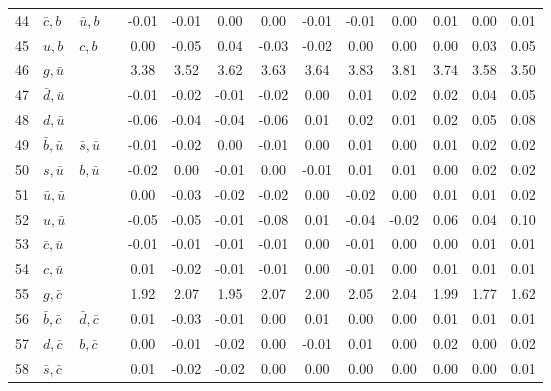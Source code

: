 \begin{tabularx}{\textwidth}{rXXX@{}S@{}S@{}S@{}S@{}S@{}S@{}S@{}S@{}S@{}S}
 44 & $\bar c, b$      & $\bar u, b$       &                  & -0.01 & -0.01 &  0.00 &  0.00 & -0.01 & -0.01 &  0.00 &  0.01 &  0.00 &  0.01 \\
 45 & $u, b$           & $c, b$            &                  &  0.00 & -0.05 &  0.04 & -0.03 & -0.02 &  0.00 &  0.00 &  0.00 &  0.03 &  0.05 \\
 46 & $g, \bar u$      &                   &                  &  3.38 &  3.52 &  3.62 &  3.63 &  3.64 &  3.83 &  3.81 &  3.74 &  3.58 &  3.50 \\
 47 & $\bar d, \bar u$ &                   &                  & -0.01 & -0.02 & -0.01 & -0.02 &  0.00 &  0.01 &  0.02 &  0.02 &  0.04 &  0.05 \\
 48 & $d, \bar u$      &                   &                  & -0.06 & -0.04 & -0.04 & -0.06 &  0.01 &  0.02 &  0.01 &  0.02 &  0.05 &  0.08 \\
 49 & $\bar b, \bar u$ & $\bar s, \bar u$  &                  & -0.01 & -0.02 &  0.00 & -0.01 &  0.00 &  0.01 &  0.00 &  0.01 &  0.02 &  0.02 \\
 50 & $s, \bar u$      & $b, \bar u$       &                  & -0.02 &  0.00 & -0.01 &  0.00 & -0.01 &  0.01 &  0.01 &  0.00 &  0.02 &  0.02 \\
 51 & $\bar u, \bar u$ &                   &                  &  0.00 & -0.03 & -0.02 & -0.02 &  0.00 & -0.02 &  0.00 &  0.01 &  0.01 &  0.02 \\
 52 & $u, \bar u$      &                   &                  & -0.05 & -0.05 & -0.01 & -0.08 &  0.01 & -0.04 & -0.02 &  0.06 &  0.04 &  0.10 \\
 53 & $\bar c, \bar u$ &                   &                  & -0.01 & -0.01 & -0.01 & -0.01 &  0.00 & -0.01 &  0.00 &  0.00 &  0.01 &  0.01 \\
 54 & $c, \bar u$      &                   &                  &  0.01 & -0.02 & -0.01 & -0.01 &  0.00 & -0.01 &  0.00 &  0.01 &  0.01 &  0.01 \\
 55 & $g, \bar c$      &                   &                  &  1.92 &  2.07 &  1.95 &  2.07 &  2.00 &  2.05 &  2.04 &  1.99 &  1.77 &  1.62 \\
 56 & $\bar b, \bar c$ & $\bar d, \bar c$  &                  &  0.01 & -0.03 & -0.01 &  0.00 &  0.01 &  0.00 &  0.00 &  0.01 &  0.01 &  0.01 \\
 57 & $d, \bar c$      & $b, \bar c$       &                  &  0.00 & -0.01 & -0.02 &  0.00 & -0.01 &  0.01 &  0.00 &  0.02 &  0.00 &  0.02 \\
 58 & $\bar s, \bar c$ &                   &                  &  0.01 & -0.02 & -0.02 &  0.00 &  0.00 &  0.00 &  0.00 &  0.00 &  0.00 &  0.01 \\

\end{tabularx}
